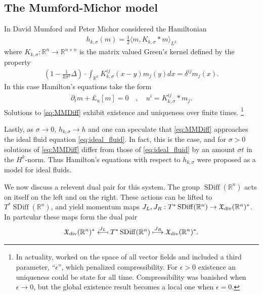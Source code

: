 \documentclass[12pt]{amsart}
\newcommand{\R}{\ensuremath{\mathbb{R}}}
\DeclareMathOperator{\SDiff}{SDiff}
\begin{document}
\subsection{The Mumford-Michor model}
\label{sec:MME}
In \cite{MumfordMichor2013} David Mumford and Peter Michor
considered the Hamiltonian
\begin{align*}
  h_{k,\sigma}(m) = \frac{1}{2} \langle m , K_{k,\sigma} * m \rangle_{L^2} 
\end{align*}
where $K_{k,\sigma}:\R^n \to \mathbb{R}^{n \times n}$ is the matrix
valued Green's kernel defined by the property
\begin{align*}
 \left(1 - \frac{1}{k \sigma^2} \Delta \right) \cdot \int_{\R^n} K_{k,\sigma}^{ij}(x - y) m_j(y) dx = \delta^{ij} m_j(x).
\end{align*}
In this case Hamilton's equations take the form
\begin{align}
	\partial_t m+ \pounds_u [ m] = 0 \quad , \quad u^i  = K^{ij}_{k,\sigma} * m_j. \label{eq:MMDiff}
\end{align}
Solutions to \eqref{eq:MMDiff} exhibit existence and uniqueness over finite times.
\footnote{In actuality, \cite{MumfordMichor2013} worked on the space of all
vector fields and included a third parameter, ``$\epsilon$'', which
penalized compressibility.  For $\epsilon > 0$ existence an uniqueness could be state for all time.
Compressibility was banished when $\epsilon \to 0$, but the global existence result becomes a local one
when $\epsilon = 0$.}

Lastly, as $\sigma \to 0$, $h_{k,\sigma} \to h$ and one can speculate that \eqref{eq:MMDiff}
approaches the ideal fluid equation \eqref{eq:ideal_fluid}.
In fact, this is the case, and for $\sigma > 0$ solutions of \eqref{eq:MMDiff}
differ from those of \eqref{eq:ideal_fluid} by an amount $\sigma t$
in the $H^k$-norm.
Thus Hamilton's equations with respect to $h_{k,\sigma}$ were proposed
as a model for ideal fluids.

We now discuss a relevent dual pair for this system.
The group $\SDiff(\R^n)$ acts on itself on the left and on the right.
These actions can be lifted to $T^{\ast}\SDiff(\R^n)$, and yield
momentum maps $J_L,J_R : T^{\ast}\SDiff(\R^n) \to \mathfrak{X}_{\rm div}(\R^n)^*$. In partcular these maps form the dual pair
\begin{align*}
  \mathfrak{X}_{\rm div}(\R^n)^*
  \stackrel{J_L}{\longmapsfrom}
  T^{\ast}\SDiff(\R^n)
  \stackrel{J_R}{\longmapsto}
  \mathfrak{X}_{\rm div}(\R^n)^*.
\end{align*}
\end{document}
